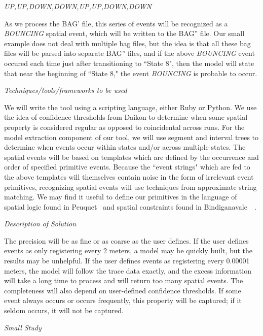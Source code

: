 \emph{UP,UP,DOWN,DOWN,UP,UP,DOWN,DOWN}

As we process the BAG' file, this series of events will be recognized as a \emph{BOUNCING} spatial event, which will be written to the BAG'' file.  
Our small example does not deal with multiple bag files, but the idea is that all these bag files will be parsed into separate BAG'' files, and if the above \emph{BOUNCING} event occured each time just after transitioning to ``State 8", then the model will state that near the beginning of ``State 8," the event \emph{BOUNCING} is probable to occur.

\emph{Techniques/tools/frameworks to be used}

We will write the tool using a scripting language, either Ruby or Python.
We use the idea of confidence thresholds from Daikon to determine when some spatial property is considered regular as opposed to coincidental across runs. 
For the model extraction component of our tool, we will use segment and interval trees to determine when events occur within states and/or across multiple states.
The spatial events will be based on templates which are defined by the occurrence and order of specified primitive events.
Because the ``event strings" which are fed to the above templates will themselves contain noise in the form of irrelevant event primitives, recognizing spatial events will use techniques from approximate string matching.
We may find it useful to define our primitives in the language of spatial logic found in Peuquet~\cite{peuquet1986use} and spatial constraints found in Bindiganavale~\etal~\cite{bindiganavale1998motion}. 

\emph{Description of Solution}

The precision will be as fine or as coarse as the user defines.
If the user defines events as only registering every 2 meters, a model may be quickly built, but the results may be unhelpful.
If the user defines events as registering every 0.00001 meters, the model will follow the trace data exactly, and the excess information will take a long time to process and will return too many spatial events.
The completeness will also depend on user-defined confidence thresholds.
If some event always occurs or occurs frequently, this property will be captured; if it seldom occurs, it will not be captured.  

\emph{Small Study}

